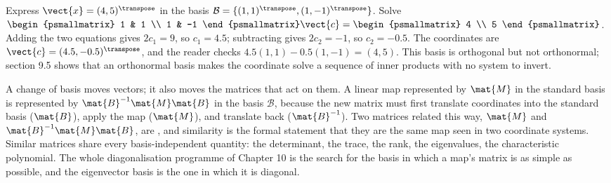 \begin{example}
Express $\vect{x} = (4, 5)^{\transpose}$ in the basis
$\mathcal{B} = \{(1,1)^{\transpose}, (1,-1)^{\transpose}\}$. Solve
$\begin{psmallmatrix} 1 & 1 \\ 1 & -1 \end{psmallmatrix}\vect{c} =
\begin{psmallmatrix} 4 \\ 5 \end{psmallmatrix}$. Adding the two
equations gives $2 c_{1} = 9$, so $c_{1} = 4.5$; subtracting gives
$2 c_{2} = -1$, so $c_{2} = -0.5$. The coordinates are $\vect{c} =
(4.5, -0.5)^{\transpose}$, and the reader checks $4.5(1,1) -
0.5(1,-1) = (4, 5)$. This basis is orthogonal but not orthonormal;
section 9.5 shows that an orthonormal basis makes the coordinate
solve a sequence of inner products with no system to invert.
\end{example}

A change of basis moves vectors; it also moves the matrices that act on
them. A linear map represented by $\mat{M}$ in the standard basis is
represented by $\mat{B}^{-1}\mat{M}\mat{B}$ in the basis $\mathcal{B}$,
because the new matrix must first translate coordinates into the
standard basis ($\mat{B}$), apply the map ($\mat{M}$), and translate
back ($\mat{B}^{-1}$). Two matrices related this way, $\mat{M}$ and
$\mat{B}^{-1}\mat{M}\mat{B}$, are , and similarity is
the formal statement that they are the same map seen in two coordinate
systems. Similar matrices share every basis-independent quantity: the
determinant, the trace, the rank, the eigenvalues, the characteristic
polynomial. The whole diagonalisation programme of Chapter 10 is the
search for the basis in which a map's matrix is as simple as possible,
and the eigenvector basis is the one in which it is diagonal.

